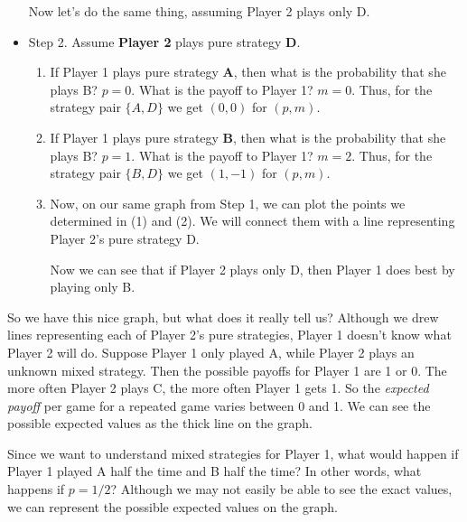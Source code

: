 \begin{itemize}
Now let's do the same thing, assuming Player 2 plays only D.
\item  Step 2. Assume {\bf Player 2} plays pure strategy {\bf D}.
\begin{enumerate}
\item If Player 1 plays pure strategy {\bf A}, then what is the probability that she plays B? $p=0$. What is the payoff to Player 1? $m=0$. Thus, for the strategy pair $\{A, D\}$ we get $(0, 0)$ for $(p, m)$.
\item If Player 1 plays pure strategy {\bf B}, then what is the probability that she plays B? $p=1$. What is the payoff to Player 1? $m=2$. Thus, for the strategy pair $\{B, D\}$ we get $(1, -1)$ for $(p, m)$.
\item Now, on our same graph from Step 1, we can plot the points we determined in (1) and (2). We will connect them with a line representing Player 2's pure strategy D.

\begin{figure}[h]
\leavevmode
\begin{center}
{\scalebox{.65}{}}
\end{center}
\end{figure}  

Now we can see that if Player 2 plays only D, then Player 1 does best by playing only B.
\end{enumerate}

\end{itemize}

So we have this nice graph, but what does it really tell us? Although we drew lines representing each of Player 2's pure strategies, Player 1 doesn't know what Player 2 will do. Suppose Player 1 only played A, while Player 2 plays an unknown mixed strategy. Then the possible payoffs for Player 1 are 1 or 0. The more often Player 2 plays C, the more often Player 1 gets 1. So the {\it expected payoff} per game for a repeated game varies between 0 and 1. We can see the possible expected values as the thick line on the graph.

\break

\begin{figure}[h]
\leavevmode
\begin{center}
{\scalebox{.65}{}}
\end{center}
\end{figure}  

Since we want to understand mixed strategies for Player 1, what would happen if Player 1 played A half the time and B half the time? In other words, what happens if $p=1/2$? Although we may not easily be able to see the exact values, we can represent the possible expected values on the graph. 

